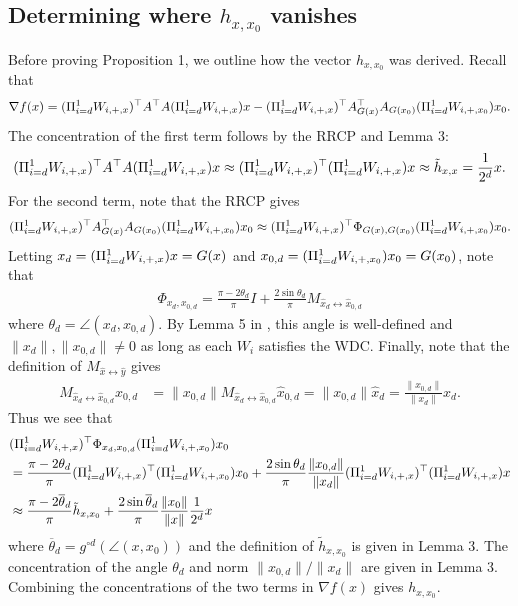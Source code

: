 \documentclass{article}
\begin{document}
\subsection{Determining where $h_{x,x_0}$ vanishes}

Before proving Proposition 1, we outline how the vector $h_{x,x_0}$ was derived. Recall that \begin{align*}
\nabla f(x) = (\Pi_{i=d}^1 W_{i,+,x})^\top A^\top A (\Pi_{i=d}^1 W_{i,+,x})x - (\Pi_{i=d}^1 W_{i,+,x})^\top A_{G(x)}^\top A_{G(x_0)}(\Pi_{i=d}^1 W_{i,+,x_0})x_0.
\end{align*} The concentration of the first term follows by the RRCP and Lemma 3: \begin{align*}
(\Pi_{i=d}^1 W_{i,+,x})^\top A^\top A (\Pi_{i=d}^1 W_{i,+,x})x \approx (\Pi_{i=d}^1 W_{i,+,x})^\top (\Pi_{i=d}^1 W_{i,+,x})x \approx \tilde{h}_{x,x} = \frac{1}{2^d}x.
\end{align*} For the second term, note that the RRCP gives
\begin{align*}
(\Pi_{i=d}^1 W_{i,+,x})^\top A_{G(x)}^\top A_{G(x_0)}(\Pi_{i=d}^1 W_{i,+,x_0})x_0 \approx (\Pi_{i=d}^1 W_{i,+,x})^\top \Phi_{G(x),G(x_0)}(\Pi_{i=d}^1 W_{i,+,x_0})x_0.
\end{align*} Letting $x_d = (\Pi_{i=d}^1 W_{i,+,x})x = G(x)$ and $x_{0,d} = (\Pi_{i=d}^1 W_{i,+,x_0})x_0 = G(x_0)$, note that \begin{align*}
\Phi_{x_d,x_{0,d}} = \frac{\pi - 2\theta_d}{\pi}I + \frac{2\sin \theta_d}{\pi} M_{\hat{x}_d \leftrightarrow \hat{x}_{0,d}}
\end{align*} where $\theta_d = \angle(x_d,x_{0,d})$. By Lemma 5 in \cite{Hand2017}, this angle is well-defined and $\|x_d\|,\|x_{0,d}\| \neq 0$ as long as each $W_i$ satisfies the WDC. Finally, note that the definition of $M_{\hat{x} \leftrightarrow \hat{y}}$ gives \begin{align*}
M_{\hat{x}_d \leftrightarrow \hat{x}_{0,d}} x_{0,d} & = \|x_{0,d}\| M_{\hat{x}_d \leftrightarrow \hat{x}_{0,d}} \hat{x}_{0,d} = \|x_{0,d}\| \hat{x}_d = \frac{\|x_{0,d}\|}{\|x_d\|}x_d.
\end{align*} Thus we see that \begin{align*}
&(\Pi_{i=d}^1 W_{i,+,x})^\top  \Phi_{x_d,x_{0,d}}(\Pi_{i=d}^1 W_{i,+,x_0})x_0 \\
& = \frac{\pi - 2\theta_d}{\pi}(\Pi_{i=d}^1 W_{i,+,x})^\top(\Pi_{i=d}^1 W_{i,+,x_0})x_0 + \frac{2\sin \theta_d}{\pi} \frac{\|x_{0,d}\|}{\|x_d\|}(\Pi_{i=d}^1 W_{i,+,x})^\top(\Pi_{i=d}^1 W_{i,+,x})x \\
& \approx \frac{\pi - 2\overline{\theta}_d}{\pi} \tilde{h}_{x,x_0} + \frac{2\sin\overline{\theta}_d}{\pi} \frac{\|x_0\|}{\|x\|} \frac{1}{2^d}x
\end{align*} where $\overline{\theta}_d = g^{\circ d}(\angle(x,x_0))$ and the definition of $\tilde{h}_{x,x_0}$ is given in Lemma 3. The concentration of the angle $\theta_d$ and norm $\|x_{0,d}\|/\|x_d\|$ are given in Lemma 3. Combining the concentrations of the two terms in $\nabla f(x)$ gives $h_{x,x_0}$.
\end{document}
